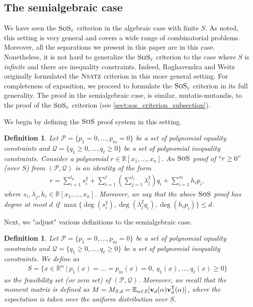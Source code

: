 \documentclass[11pt]{article}
\newcommand{\sos}{\text{\sc{SoS}}}
\newcommand{\Nsatz}{\textsc{Nsatz}}
\newcommand{\1}{\textbf{1}}
\newtheorem{definition}[theorem]{Definition}
\begin{document}
\subsection{The semialgebraic case}\label{sect:semialgebraic_sos_criterion}

We have seen the $\sos_{\varepsilon}$ criterion in the algebraic case with finite $S$. As noted, this setting is very general and covers a wide range of combinatorial problems. Moreover, all the separations we present in this paper are in this case.
Nonetheless, it is not hard to generalize the $\sos_{\varepsilon}$ criterion to the case where $S$ is \textit{infinite} and there are inequality constraints.
Indeed, Raghavendra and Weitz \cite{raghavendra_weitz2017} originally formulated the $\Nsatz$ criterion in this more general setting. For completeness of exposition, we proceed to formulate the $\sos_{\varepsilon}$ criterion in its full generality. The proof in the semialgebraic case, is similar, mutatis-mutandis, to the proof of the $\sos_{\varepsilon}$ criterion (see \cref{sect:sos_criterion_subsection}).

We begin by defining the $\sos$ proof system in this setting.

\begin{definition}
    Let $\mathcal{P} = \{p_1=0,\ldots,p_m=0\}$ be a set of polynomial equality constraints and $\mathcal{Q} = \{q_1 \geq 0, \ldots, q_\ell \geq 0\}$ be a set of polynomial inequality constraints. Consider a polynomial $r\in \mathbb{R}[x_1, \dots, x_n]$. An $\sos$ proof of $``r\geq 0"$ (over $S$) from $(\mathcal{P}, \mathcal{Q})$ is an identity of the form 
    \begin{align*}
        r = \sum_{i=1}^{t_0} s_i^2 + \sum_{i=1}^\ell \left( \sum_{j=1}^{t_i} \lambda_j^2 \right) q_i + \sum_{i=1}^m h_i p_i,
    \end{align*}
where $s_i, \lambda_j, h_i\in \mathbb{R}[x_1, \ldots, x_n]$. Moreover, we say that the above $\sos$ proof 
    has \emph{degree} at most $d$ if $\max \{\deg(s_i^2), \deg(\lambda_j^2 q_i), \deg(h_ip_i)\} \leq d$.
\end{definition}

Next, we "adjust" various definitions to the semialgebraic case.

\begin{definition}
    Let $\mathcal{P} = \{p_1=0,\ldots,p_m=0\}$ be a set of polynomial equality constraints and $\mathcal{Q} = \{q_1 \geq 0, \ldots, q_\ell \geq 0\}$ be a set of polynomial inequality constraints. We define as
    \begin{align*}
        S = \{x \in \mathbb{R}^n \ | \ p_1(x) = \ldots = p_m(x) =0, \ q_1(x), \ldots, q_\ell(x) \geq 0\}
    \end{align*}
    as the \emph{feasibility set} (or \emph{zero set}) of $(\mathcal{P}, \mathcal{Q})$. Moreover, we recall that the moment matrix is defined as $M = M_{S,d} = \mathbb{E}_{\alpha \in S}[\mathbf{v}_d(\alpha) \mathbf{v}_d^{\sf{T}}(\alpha)]$, where the expectation is taken over the uniform distribution over $S$.
\end{definition}
\end{document}
